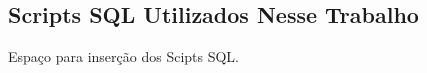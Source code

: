 \begin{anexosenv}
  \chapter{Scripts SQL Utilizados Nesse Trabalho} \label{anex:anexo1}

  Espaço para inserção dos Scipts SQL.

  \end{anexosenv}